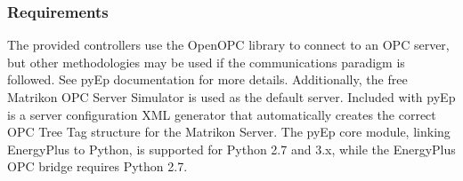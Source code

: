 \subsubsection{Requirements}

The provided controllers use the OpenOPC library to connect to an OPC server, but other methodologies may be used if the communications paradigm is followed. See pyEp documentation for more details.
Additionally, the free Matrikon OPC Server Simulator is used as the default server.
Included with pyEp is a server configuration XML generator that automatically creates the correct OPC Tree Tag structure for the Matrikon Server. 
The pyEp core module, linking EnergyPlus to Python, is supported for Python 2.7 and 3.x, while the EnergyPlus OPC bridge requires Python 2.7.

